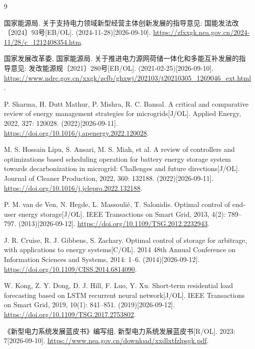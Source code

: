 \begin{thebibliography}{9}
\raggedright
{}
国家能源局.
关于支持电力领域新型经营主体创新发展的指导意见: 国能发法改〔2024〕93号[EB/OL].
(2024-11-28)[2026-09-10].
\url{https://zfxxgk.nea.gov.cn/2024-11/28/c_1212408354.htm}.

国家发展改革委, 国家能源局.
关于推进电力源网荷储一体化和多能互补发展的指导意见: 发改能源规〔2021〕280号[EB/OL].
(2021-02-25)[2026-09-10].
\url{https://www.ndrc.gov.cn/xxgk/zcfb/ghxwj/202103/t20210305_1269046_ext.html}.

P. Sharma, H. Dutt Mathur, P. Mishra, R. C. Bansal.
A critical and comparative review of energy management strategies for microgrids[J/OL].
Applied Energy, 2022, 327: 120028.
(2022)[2026-09-11].
\url{https://doi.org/10.1016/j.apenergy.2022.120028}.

M. S. Hossain Lipu, S. Ansari, M. S. Miah, et al.
A review of controllers and optimizations based scheduling operation for battery energy storage system towards decarbonization in microgrid: Challenges and future directions[J/OL].
Journal of Cleaner Production, 2022, 360: 132188.
(2022)[2026-09-11].
\url{https://doi.org/10.1016/j.jclepro.2022.132188}.

P. M. van de Ven, N. Hegde, L. Massouli\'e, T. Salonidis.
Optimal control of end-user energy storage[J/OL].
IEEE Transactions on Smart Grid, 2013, 4(2): 789--797.
(2013)[2026-09-12].
\url{https://doi.org/10.1109/TSG.2012.2232943}.

J. R. Cruise, R. J. Gibbens, S. Zachary.
Optimal control of storage for arbitrage, with applications to energy systems[C/OL].
2014 48th Annual Conference on Information Sciences and Systems, 2014: 1--6.
(2014)[2026-09-12].
\url{https://doi.org/10.1109/CISS.2014.6814090}.

W. Kong, Z. Y. Dong, D. J. Hill, F. Luo, Y. Xu.
Short-term residential load forecasting based on LSTM recurrent neural network[J/OL].
IEEE Transactions on Smart Grid, 2019, 10(1): 841--851.
(2019)[2026-09-12].
\url{https://doi.org/10.1109/TSG.2017.2753802}.

《新型电力系统发展蓝皮书》编写组.
新型电力系统发展蓝皮书[R/OL].
2023: 7[2026-09-10].
\url{https://www.nea.gov.cn/download/xxdlxtfzlpsgk.pdf}.

\end{thebibliography}
